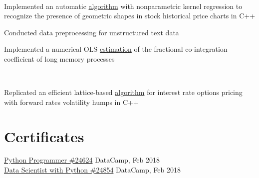 \documentclass[]{hieudo-build}
\begin{document}
\begin{minipage}[t]{0.65\textwidth}
 \\
\begin{tightemize}
\item Implemented an automatic \href{https://bit.ly/2LGotGC}{algorithm} with nonparametric kernel regression to recognize the presence of geometric shapes in stock historical price charts in C++

\item Conducted data preprocessing for unstructured text data
\item Implemented a numerical OLS \href{http://www3.stat.sinica.edu.tw/2005wei/Ho_HC.pdf}{estimation} of the fractional co-integration coefficient of long memory processes
\end{tightemize}
\sectionsep

 \\
\begin{tightemize}
\item Replicated an efficient lattice-based \href{https://bit.ly/2LEx1gV}{algorithm} for interest rate options pricing with forward rates volatility humps in C++
\end{tightemize}
\sectionsep

\section{Certificates}
\href{https://www.datacamp.com/statement-of-accomplishment/track/2380b142ca0efe8ccf46d72295e6c90ef2b7b165?lipi=urn%3Ali%3Apage%3Ad_flagship3_profile_view_base%3BC877CZzpQNG%2BcsyBdM5s%2Fw%3D%3D}{Python Programmer \#24624} \hfill DataCamp, Feb 2018 \\

\href{https://www.datacamp.com/statement-of-accomplishment/track/acd2c1fde62ac121f65f4e2f004ee9f5cdbd06ba?lipi=urn%3Ali%3Apage%3Ad_flagship3_profile_view_base%3BC877CZzpQNG%2BcsyBdM5s%2Fw%3D%3D}{Data Scientist with Python \#24854} \hfill DataCamp, Feb 2018 \\

\end{minipage} 
\end{document}

